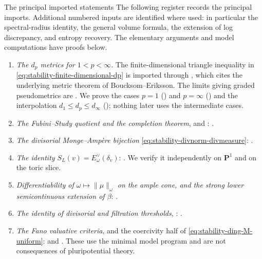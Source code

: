 \begin{important}{The principal imported statements}
\label{imp:ch50-imported}
The following register records the principal imports.  Additional numbered
inputs are identified where used: in particular the spectral-radius identity,
the general volume formula, the extension of log discrepancy, and entropy
recovery.  The elementary arguments and model computations have proofs below.
\begin{enumerate}
\item\label{itm:ch50-import:dp}
      \emph{The $d_p$ metrics for $1<p<\infty$.}  The finite-dimensional
      triangle inequality in \eqref{eq:stability-finite-dimensional-dp}
      is imported through \cite[\S3.1]{BJKS1}, which cites the underlying
      metric theorem of Boucksom--Eriksson.  The limits giving graded
      pseudometrics are \cite[Theorem~3.3]{BJKS1}.  We prove the
      cases $p=1$ () and $p=\infty$
      () and the interpolation
      $d_1\le d_p\le d_\infty$
      (); nothing later uses the
      intermediate cases.
\item\label{itm:ch50-import:quotient}
      \emph{The Fubini--Study quotient and the completion theorem},
       and
      : \cite[Theorems~A and~B]{BJKS1}.
\item\label{itm:ch50-import:divisorial}
      \emph{The divisorial Monge--Amp\`ere bijection}
      \eqref{eq:stability-divnorm-divmeasure}: \cite[Theorem~C]{BJKS1}.
\item\label{itm:ch50-import:S}
      \emph{The identity $S_L(v)=E^\vee_\omega(\delta_v)$}:
      \cite[Theorem~7.22(iii)]{BJKS1}.  We verify it independently on
      $\mathbf P^1$ and on the toric slice.
\item\label{itm:ch50-import:beta}
      \emph{Differentiability of $\omega\mapsto\|\mu\|_\omega$ on the
      ample cone, and the strong lower semicontinuous extension of
      $\beta$}: \cite[Theorem~2.15 and \S\S3.4, 4.1]{BJKS2}.
\item\label{itm:ch50-import:filtration}
      \emph{The identity of divisorial and filtration thresholds},
      :
      \cite[Theorem~5.8]{BJKS2}.
\item\label{itm:ch50-import:fano}
      \emph{The Fano valuative criteria}, 
      and the coercivity half of \eqref{eq:stability-ding-M-uniform}:
      \cite{Li17,Fuj19,BJ20} and \cite[Theorem~8.6]{BHJ17}.  These use the
      minimal model program and are not consequences of pluripotential
      theory.
\end{enumerate}
\end{important}

